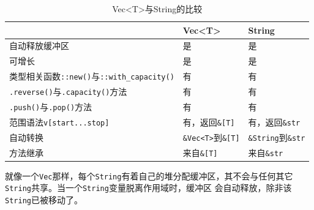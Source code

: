 \smallskip
\begin{table}[h]
    \small
    \caption{Vec<T>与String的比较}\label{TABLE3-11}
    \begin{tabularx}{\linewidth}{p{250pt} X X}
        \toprule
         & \textbf{Vec<T>} & \textbf{String}\\
        \midrule
        自动释放缓冲区 & 是 & 是 \\
        可增长 & 是 & 是 \\
        类型相关函数\texttt{::new()}与\texttt{::with\_capacity()} & 有 & 有 \\
        \texttt{.reverse()}与\texttt{.capacity()}方法 & 有 & 有 \\
        \texttt{.push()}与\texttt{.pop()}方法 & 有 & 有 \\
        范围语法\texttt{v[start...stop]} & 有，返回\texttt{\&[T]} & 有，返回\texttt{\&str} \\
        自动转换 & \texttt{\&Vec<T>}到\texttt{\&[T]} & \texttt{\&String}到\texttt{\&str} \\
        方法继承 & 来自\texttt{\&[T]} & 来自\texttt{\&str} \\
        \bottomrule
    \end{tabularx}
\end{table}

\smallskip
就像一个\texttt{Vec}那样，每个\texttt{String}有着自己的堆分配缓冲区，其不会与任何其它\texttt{String}共享。当一个\texttt{String}变量脱离作用域时，缓冲区
会自动释放，除非该\texttt{String}已被移动了。

